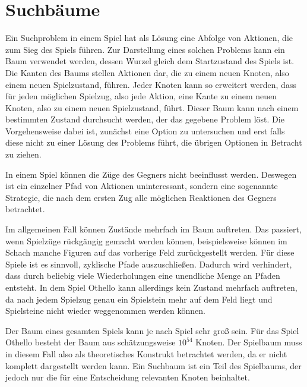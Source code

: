 \section{Suchbäume}


Ein Suchproblem in einem Spiel hat als Lösung eine Abfolge von Aktionen, die zum Sieg des Spiels führen.
Zur Darstellung eines solchen Problems kann ein Baum verwendet werden, dessen Wurzel gleich dem Startzustand des Spiels ist.
Die Kanten des Baums stellen Aktionen dar, die zu einem neuen Knoten, also einem neuen Spielzustand, führen.
Jeder Knoten kann so erweitert werden, dass für jeden möglichen Spielzug, also jede Aktion, eine Kante zu einem neuen Knoten, also zu einem neuen Spielzustand, führt.
Dieser Baum kann nach einem bestimmten Zustand durchsucht werden, der das gegebene Problem löst.
Die Vorgehensweise dabei ist, zunächst eine Option zu untersuchen und erst falls diese nicht zu einer Lösung des Problems führt, die übrigen Optionen in Betracht zu ziehen.
\cite[S.~75]{ai2010russel}

In einem Spiel können die Züge des Gegners nicht beeinflusst werden.
Deswegen ist ein einzelner Pfad von Aktionen uninteressant, sondern eine sogenannte Strategie, die nach dem ersten Zug alle möglichen Reaktionen des Gegners betrachtet.
\cite[S.~163]{ai2010russel}

Im allgemeinen Fall können Zustände mehrfach im Baum auftreten.
Das passiert, wenn Spielzüge rückgängig gemacht werden können, beispielsweise können im Schach manche Figuren auf das vorherige Feld zurückgestellt werden.
Für diese Spiele ist es sinnvoll, zyklische Pfade auszuschließen. %
Dadurch wird verhindert, dass durch beliebig viele Wiederholungen eine unendliche Menge an Pfaden entsteht.
\cite[S.~75]{ai2010russel}
In dem Spiel Othello kann allerdings kein Zustand mehrfach auftreten, da nach jedem Spielzug genau ein Spielstein mehr auf dem Feld liegt und Spielsteine nicht wieder weggenommen werden können.

Der Baum eines gesamten Spiels kann je nach Spiel sehr groß sein.
Für das Spiel Othello besteht der Baum aus schätzungsweise $10^{54}$ Knoten. %
Der Spielbaum muss in diesem Fall also als theoretisches Konstrukt betrachtet werden, da er nicht komplett dargestellt werden kann.
Ein Suchbaum ist ein Teil des Spielbaums, der jedoch nur die für eine Entscheidung relevanten Knoten beinhaltet.
\cite[S.~162f.]{ai2010russel}
